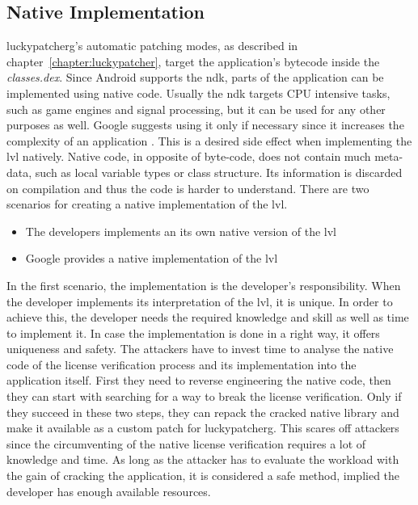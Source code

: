 \subsection{Native Implementation} \label{subsection:counter-modifications-dynamic}
\gls{luckypatcherg}'s automatic patching modes, as described in chapter~\ref{chapter:luckypatcher}, target the application's bytecode inside the \textit{classes.dex}.
Since Android supports the \gls{ndk}, parts of the application can be implemented using native code.
\newline
Usually the \gls{ndk} targets CPU intensive tasks, such as game engines and signal processing, but it can be used for any other purposes as well.
Google suggests using it only if necessary since it increases the complexity of an application \cite{androidNdk}.
This is a desired side effect when implementing the \gls{lvl} natively.
Native code, in opposite of byte-code, does not contain much meta-data, such as local variable types or class structure.
Its information is discarded on compilation and thus the code is harder to understand.
\newline
There are two scenarios for creating a native implementation of the \gls{lvl}.
\begin{itemize}
  \item The developers implements an its own native version of the \gls{lvl}
  \item Google provides a native implementation of the \gls{lvl}
\end{itemize}
In the first scenario, the implementation is the developer's responsibility.
When the developer implements its interpretation of the \gls{lvl}, it is unique.
In order to achieve this, the developer needs the required knowledge and skill as well as time to implement it.
In case the implementation is done in a right way, it offers uniqueness and safety.
The attackers have to invest time to analyse the native code of the license verification process and its implementation into the application itself.
First they need to reverse engineering the native code, then they can start with searching for a way to break the license verification.
Only if they succeed in these two steps, they can repack the cracked native library and make it available as a custom patch for \gls{luckypatcherg}.
This scares off attackers since the circumventing of the native license verification requires a lot of knowledge and time.
As long as the attacker has to evaluate the workload with the gain of cracking the application, it is considered a safe method, implied the developer has enough available resources. \cite{munteanLicense}
